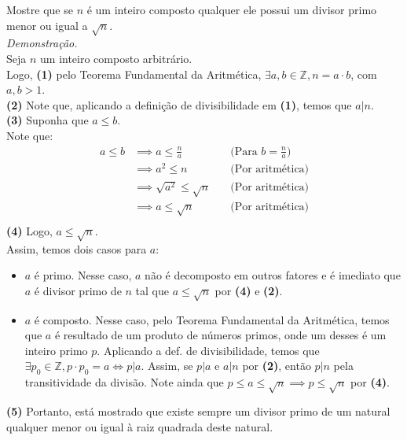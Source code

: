 Mostre que se $n$ é um inteiro composto qualquer ele possui um divisor primo menor ou igual a $\sqrt{n}$. \\
\emph{Demonstração.} \\
Seja $n$ um inteiro composto arbitrário. \\
Logo, \textbf{(1)} pelo Teorema Fundamental da Aritmética, $\exists a, b \in \mathbb{Z}, n = a\cdot b$, com $a, b > 1$. \\
\textbf{(2)} Note que, aplicando a definição de divisibilidade em \textbf{(1)}, temos que $a | n$. \\
\textbf{(3)} Suponha que $a \leq b$. \\
Note que:
\begin{align*}
    a \leq b                 & \implies a \leq \frac{n}{a}   & \quad \text{(Para $b = \frac{n}{a}$)} \\ &\implies
    a^2 \leq n               & \quad \text{(Por aritmética)}                                         \\ &\implies
    \sqrt{a^2} \leq \sqrt{n} & \quad \text{(Por aritmética)}                                         \\ &\implies
    a \leq \sqrt{n}          & \quad \text{(Por aritmética)}                                         \\
\end{align*}
\textbf{(4)} Logo, $a \leq \sqrt{n}$.\\
Assim, temos dois casos para $a$:
\begin{itemize}
    \item $a$ é primo. Nesse caso, $a$ não é decomposto em outros fatores e é imediato que $a$ é divisor primo de $n$ tal que $a \leq \sqrt{n}$ por \textbf{(4)} e \textbf{(2)}.
    \item $a$ é composto. Nesse caso, pelo Teorema Fundamental da Aritmética, temos que $a$ é resultado de um produto de números primos, onde um desses é um inteiro primo $p$. Aplicando a def. de divisibilidade, temos que $\exists p_0 \in \mathbb{Z}, p \cdot p_0 = a \iff p | a$. Assim, se $p | a$ e $a | n$ por \textbf{(2)}, então $p | n$ pela transitividade da divisão. Note ainda que $p \leq a \leq \sqrt{n} \implies p \leq \sqrt{n}$ por \textbf{(4)}.
\end{itemize}
\textbf{(5)} Portanto, está mostrado que existe sempre um divisor primo de um natural qualquer menor ou igual à raiz quadrada deste natural.